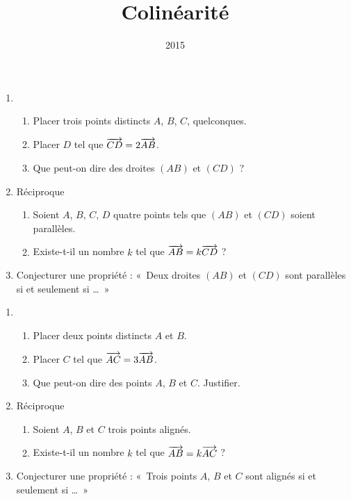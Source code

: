 \documentclass[14pt, aspectratio=43]{beamer}
\institute{Lycée Marie Curie}
\date{2015}
\title{Colinéarité}
\begin{document}
\begin{frame}
  \begin{enumerate}
    \item 
      \begin{enumerate}
        \item Placer trois points distincts $A$, $B$, $C$, quelconques.
        \item Placer $D$ tel que $\overrightarrow{CD}=2\overrightarrow{AB}$.
        \item Que peut-on dire des droites $\left( AB \right)$ et $\left( CD \right)$ ?
      \end{enumerate}
    \item Réciproque
      \begin{enumerate}
        \item Soient $A$, $B$, $C$, $D$ quatre points tels que $\left( AB \right)$ et $\left( CD \right)$ soient parallèles.
        \item Existe-t-il un nombre $k$ tel que $\overrightarrow{AB}=k\overrightarrow{CD}$ ?
      \end{enumerate}
    \item Conjecturer une propriété : «~Deux droites $\left( AB \right)$ et $\left( CD \right)$ sont parallèles si et seulement si \ldots~»
  \end{enumerate}
\end{frame}

\begin{frame}
  \begin{enumerate}
    \item 
      \begin{enumerate}
        \item Placer deux points distincts $A$ et $B$.
        \item Placer $C$ tel que $\overrightarrow{AC}=3\overrightarrow{AB}$.
        \item Que peut-on dire des points $A$, $B$ et $C$. Justifier.
      \end{enumerate}
    \item Réciproque
      \begin{enumerate}
        \item Soient $A$, $B$ et $C$ trois points alignés.
        \item Existe-t-il un nombre $k$ tel que $\overrightarrow{AB}=k\overrightarrow{AC}$ ?
      \end{enumerate}
    \item Conjecturer une propriété : «~Trois points $A$, $B$ et $C$ sont alignés si et seulement si \ldots~»
  \end{enumerate}
\end{frame}
\end{document}
